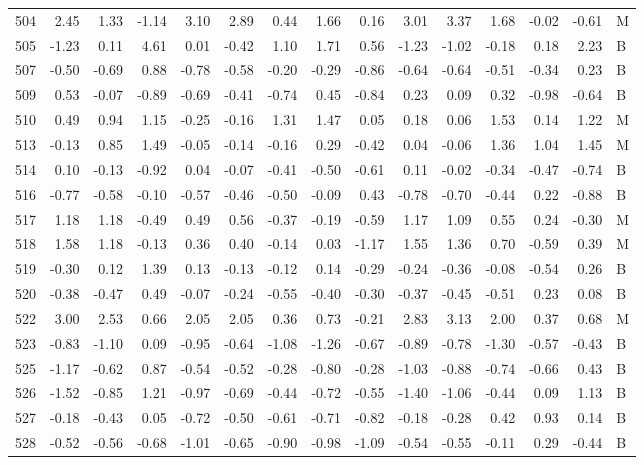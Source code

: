 \begin{table}[ht]
\begin{tabular}{rrrrrrrrrrrrrrl}
  504 & 2.45 & 1.33 & -1.14 & 3.10 & 2.89 & 0.44 & 1.66 & 0.16 & 3.01 & 3.37 & 1.68 & -0.02 & -0.61 & M \\ 
  505 & -1.23 & 0.11 & 4.61 & 0.01 & -0.42 & 1.10 & 1.71 & 0.56 & -1.23 & -1.02 & -0.18 & 0.18 & 2.23 & B \\ 
  507 & -0.50 & -0.69 & 0.88 & -0.78 & -0.58 & -0.20 & -0.29 & -0.86 & -0.64 & -0.64 & -0.51 & -0.34 & 0.23 & B \\ 
  509 & 0.53 & -0.07 & -0.89 & -0.69 & -0.41 & -0.74 & 0.45 & -0.84 & 0.23 & 0.09 & 0.32 & -0.98 & -0.64 & B \\ 
  510 & 0.49 & 0.94 & 1.15 & -0.25 & -0.16 & 1.31 & 1.47 & 0.05 & 0.18 & 0.06 & 1.53 & 0.14 & 1.22 & M \\ 
  513 & -0.13 & 0.85 & 1.49 & -0.05 & -0.14 & -0.16 & 0.29 & -0.42 & 0.04 & -0.06 & 1.36 & 1.04 & 1.45 & M \\ 
  514 & 0.10 & -0.13 & -0.92 & 0.04 & -0.07 & -0.41 & -0.50 & -0.61 & 0.11 & -0.02 & -0.34 & -0.47 & -0.74 & B \\ 
  516 & -0.77 & -0.58 & -0.10 & -0.57 & -0.46 & -0.50 & -0.09 & 0.43 & -0.78 & -0.70 & -0.44 & 0.22 & -0.88 & B \\ 
  517 & 1.18 & 1.18 & -0.49 & 0.49 & 0.56 & -0.37 & -0.19 & -0.59 & 1.17 & 1.09 & 0.55 & 0.24 & -0.30 & M \\ 
  518 & 1.58 & 1.18 & -0.13 & 0.36 & 0.40 & -0.14 & 0.03 & -1.17 & 1.55 & 1.36 & 0.70 & -0.59 & 0.39 & M \\ 
  519 & -0.30 & 0.12 & 1.39 & 0.13 & -0.13 & -0.12 & 0.14 & -0.29 & -0.24 & -0.36 & -0.08 & -0.54 & 0.26 & B \\ 
  520 & -0.38 & -0.47 & 0.49 & -0.07 & -0.24 & -0.55 & -0.40 & -0.30 & -0.37 & -0.45 & -0.51 & 0.23 & 0.08 & B \\ 
  522 & 3.00 & 2.53 & 0.66 & 2.05 & 2.05 & 0.36 & 0.73 & -0.21 & 2.83 & 3.13 & 2.00 & 0.37 & 0.68 & M \\ 
  523 & -0.83 & -1.10 & 0.09 & -0.95 & -0.64 & -1.08 & -1.26 & -0.67 & -0.89 & -0.78 & -1.30 & -0.57 & -0.43 & B \\ 
  525 & -1.17 & -0.62 & 0.87 & -0.54 & -0.52 & -0.28 & -0.80 & -0.28 & -1.03 & -0.88 & -0.74 & -0.66 & 0.43 & B \\ 
  526 & -1.52 & -0.85 & 1.21 & -0.97 & -0.69 & -0.44 & -0.72 & -0.55 & -1.40 & -1.06 & -0.44 & 0.09 & 1.13 & B \\ 
  527 & -0.18 & -0.43 & 0.05 & -0.72 & -0.50 & -0.61 & -0.71 & -0.82 & -0.18 & -0.28 & 0.42 & 0.93 & 0.14 & B \\ 
  528 & -0.52 & -0.56 & -0.68 & -1.01 & -0.65 & -0.90 & -0.98 & -1.09 & -0.54 & -0.55 & -0.11 & 0.29 & -0.44 & B \\ 

\end{tabular}
\end{table}
